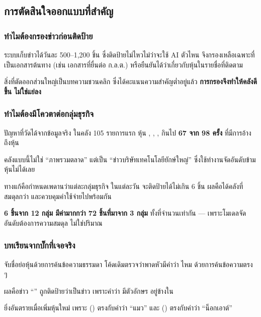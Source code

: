 \documentclass[11pt]{article}
\begin{document}
\subsection{การตัดสินใจออกแบบที่สำคัญ}

\subsubsection{ทำไมต้องกรองข่าวก่อนติดป้าย}

ระบบเก็บข่าวได้วันละ 500--1{,}200 ชิ้น ซึ่งติดป้ายไม่ไหวไม่ว่าจะใช้ AI ตัวไหน
จึงกรองเหลือเฉพาะที่เป็นเอกสารต้นทาง (เช่น เอกสารที่ยื่นต่อ ก.ล.ต.)
หรือยืนยันได้ว่าเกี่ยวกับหุ้นในรายชื่อที่ติดตาม

สิ่งที่ตัดออกส่วนใหญ่เป็นบทความชวนคลิก ซึ่งได้คะแนนความสำคัญต่ำอยู่แล้ว
\textbf{การกรองจึงทำให้คลังดีขึ้น ไม่ใช่แย่ลง}

\subsubsection{ทำไมต้องมีโควตาต่อกลุ่มธุรกิจ}

\begin{trap}{ปัญหาที่วัดได้จากข้อมูลจริง}
ในคลัง 105 รายการแรก หุ้น , , , 
กินไป \textbf{67 จาก 98 ครั้ง} ที่มีการอ้างถึงหุ้น

คลังแบบนี้ไม่ใช่ ``ภาพรวมตลาด'' แต่เป็น ``ข่าวบริษัทเทคโนโลยียักษ์ใหญ่''
ซึ่งใช้ทำงานจัดอันดับข้ามหุ้นไม่ได้เลย
\end{trap}

ทางแก้คือกำหนดเพดานว่าแต่ละกลุ่มธุรกิจ ในแต่ละวัน จะติดป้ายได้ไม่เกิน 6 ชิ้น
ผลคือได้คลังที่สมดุลกว่า และควบคุมค่าใช้จ่ายไปพร้อมกัน

\begin{keypoint}
\textbf{6 ชิ้นจาก 12 กลุ่ม มีค่ามากกว่า 72 ชิ้นที่มาจาก 3 กลุ่ม}
ทั้งที่จำนวนเท่ากัน --- เพราะโมเดลจัดอันดับต้องการความสมดุล ไม่ใช่ปริมาณ
\end{keypoint}

\subsubsection{บทเรียนจากบั๊กที่เจอจริง}

\begin{trap}{จับชื่อย่อหุ้นด้วยการค้นข้อความธรรมดา}
โค้ดเดิมตรวจว่าพาดหัวมีคำว่า  ไหม ด้วยการค้นข้อความตรง ๆ

ผลคือข่าว ``'' ถูกติดป้ายว่าเป็นข่าว
 เพราะคำว่า  มีตัวอักษร  อยู่ข้างใน

ยิ่งอันตรายเมื่อเพิ่มหุ้นใหม่ เพราะ  () ตรงกับคำว่า ``แมว''
และ  () ตรงกับคำว่า ``น็อกเอาต์''
\end{trap}
\end{document}
